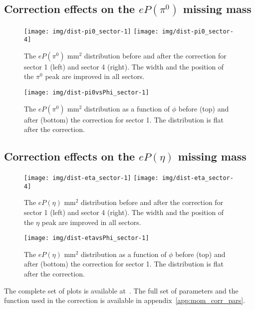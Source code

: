 \clearpage\newpage
\subsection{Correction effects on the $eP(\pi^0)$ missing mass}

\begin{figure}[h]
    \centering
    \texttt{[image: img/dist-pi0\_sector-1]}
    \texttt{[image: img/dist-pi0\_sector-4]}
    \caption{The  $eP(\pi^0)$ mm$^2$ distribution before and after the correction for sector 1 (left) and
    sector 4 (right). The width and the position of the $\pi^0$ peak are improved in all sectors.}
    \label{fig:dist-pi0_sector-1}
\end{figure}


\begin{figure}[h]
    \centering
    \texttt{[image: img/dist-pi0vsPhi\_sector-1]}
    \caption{The $eP(\pi^0)$ mm$^2$ distribution as a function of $\phi$ before (top) and after (bottom) the correction
             for sector 1. The distribution is flat after the correction.}
    \label{fig:dist-pi0vsPhi_sector-1}
\end{figure}



\clearpage\newpage
\subsection{Correction effects on the $eP(\eta)$ missing mass}

\begin{figure}[h]
    \centering
    \texttt{[image: img/dist-eta\_sector-1]}
    \texttt{[image: img/dist-eta\_sector-4]}
    \caption{The  $eP(\eta)$ mm$^2$ distribution before and after the correction for sector 1 (left) and
    sector 4 (right). The width and the position of the $\eta$ peak are improved in all sectors.}
    \label{fig:dist-eta_sector-1}
\end{figure}

\clearpage\newpage

\begin{figure}[h]
    \centering
    \texttt{[image: img/dist-etavsPhi\_sector-1]}
    \caption{The $eP(\eta)$ mm$^2$ distribution as a function of $\phi$ before (top) and after (bottom) the correction
             for sector 1. The distribution is flat after the correction.}    \label{fig:dist-etavsPhi_sector-1}
\end{figure}





The complete set of plots is available at~\cite{bib:e_kin_cor}. The full set of parameters and the function used in
the correction is available in appendix~\ref{app:mom_corr_pars}.


